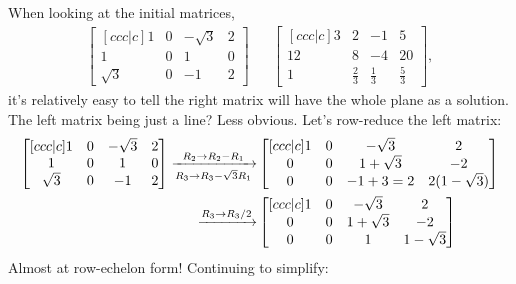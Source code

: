\documentclass[12pt]{scrartcl}
\begin{document}
When looking at the initial matrices,
\begin{align*}
    \begin{bmatrix}[ccc|c]
    1 & 0 & -\sqrt3 & 2 \\
    1 & 0 & 1 & 0 \\
    \sqrt3 & 0 & -1 & 2
    \end{bmatrix}
    &&
    \begin{bmatrix}[ccc|c]
        3 & 2 & -1 & 5 \\
        12 & 8 & -4 & 20 \\
        1 & \frac{2}{3} & \frac{1}{3} & \frac{5}{3}
    \end{bmatrix},
\end{align*}
it's relatively easy to tell the right matrix will have the whole plane as a solution. The left matrix being just a line? Less obvious. Let's row-reduce the left matrix:
\begin{align*}
    \begin{bmatrix}[ccc|c]
        1 & 0 & -\sqrt3 & 2 \\
        1 & 0 & 1 & 0 \\
        \sqrt3 & 0 & -1 & 2
    \end{bmatrix}
    \xto[R_2 \to R_2 - R_1][R_3 \to R_3 - \sqrt 3 R_1]&
    \begin{bmatrix}[ccc|c]
        1 & 0 & -\sqrt{3} & 2 \\
        0 & 0 & 1 + \sqrt3 & -2 \\
        0 & 0 & -1 + 3 = 2 & 2(1 - \sqrt3)
    \end{bmatrix}\\
    \xto[R_3 \to R_3/2]&
    \begin{bmatrix}[ccc|c]
        1 & 0 & -\sqrt{3} & 2 \\
        0 & 0 & 1 + \sqrt3 & -2 \\
        0 & 0 & 1 & 1 - \sqrt3
    \end{bmatrix}
\end{align*}
Almost at row-echelon form! Continuing to simplify:
\end{document}
